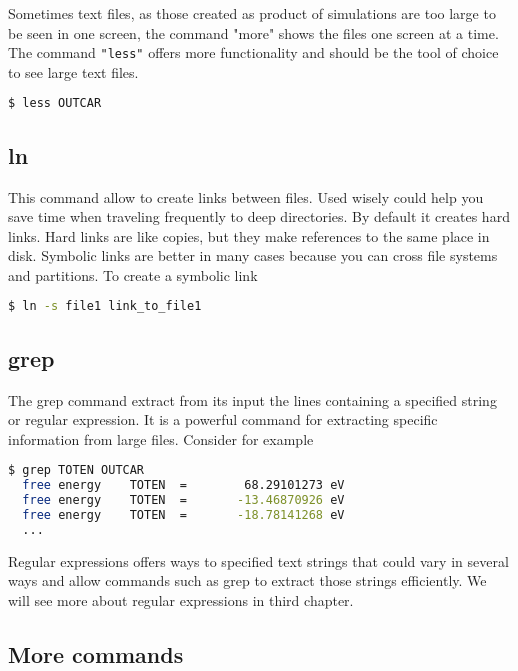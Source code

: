 Sometimes text files, as those created as product of simulations are too large to be seen in one screen, the command "more" shows the files one screen at a time. The command \texttt{"less"} offers more functionality and should be the tool of choice to see large text files. 

\begin{lstlisting}[language=bash]
$ less OUTCAR
\end{lstlisting}

\subsection{ln}

This command allow to create links between files. Used wisely could help you save time when traveling frequently to deep directories. By default it creates hard links. Hard links are like copies, but they make references to the same place in disk. Symbolic links are better in many cases because you can cross file systems and partitions. To create a symbolic link

\begin{lstlisting}[language=bash]
$ ln -s file1 link_to_file1
\end{lstlisting}
 
\subsection{grep}

The grep command extract from its input the lines containing a specified string or regular expression. It is a powerful command for extracting specific information from large files. Consider for example

\begin{lstlisting}[language=bash]
$ grep TOTEN OUTCAR
  free energy    TOTEN  =        68.29101273 eV
  free energy    TOTEN  =       -13.46870926 eV
  free energy    TOTEN  =       -18.78141268 eV
  ...
\end{lstlisting}
  
Regular expressions offers ways to specified text strings that could vary in several ways and allow commands such as grep to extract those strings efficiently. We will see more about regular expressions in third chapter.

\subsection{More commands}

